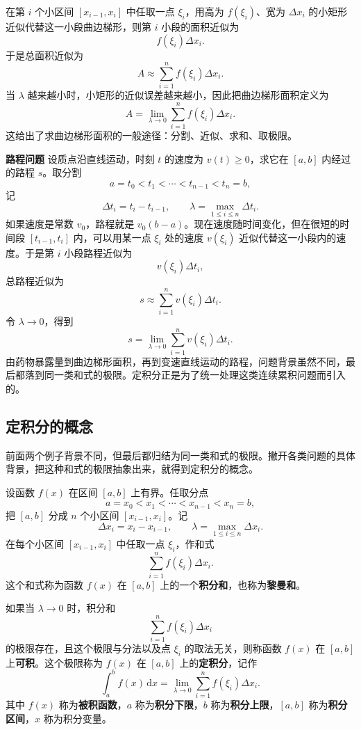 \documentclass[fontset=fandol]{ctexart}
\newenvironment{custom}[1]{\par\noindent\textbf{#1}\quad}{\par\vspace{0.8em}}
\newcommand{\dd}{\mathrm{d}}
\begin{document}
在第 $i$ 个小区间 $[x_{i-1},x_i]$ 中任取一点 $\xi_i$，用高为 $f(\xi_i)$、宽为 $\Delta x_i$ 的小矩形近似代替这一小段曲边梯形，则第 $i$ 小段的面积近似为
\[
f(\xi_i)\Delta x_i.
\]
于是总面积近似为
\[
A\approx \sum_{i=1}^n f(\xi_i)\Delta x_i.
\]
当 $\lambda$ 越来越小时，小矩形的近似误差越来越小，因此把曲边梯形面积定义为
\[
A=\lim_{\lambda\to0}\sum_{i=1}^n f(\xi_i)\Delta x_i.
\]
这给出了求曲边梯形面积的一般途径：分割、近似、求和、取极限。

\begin{custom}{路程问题}
设质点沿直线运动，时刻 $t$ 的速度为 $v(t)\geq0$，求它在 $[a,b]$ 内经过的路程 $s$。取分割
\[
a=t_0<t_1<\cdots<t_{n-1}<t_n=b,
\]
记
\[
\Delta t_i=t_i-t_{i-1},\qquad \lambda=\max_{1\leq i\leq n}\Delta t_i.
\]
如果速度是常数 $v_0$，路程就是 $v_0(b-a)$。现在速度随时间变化，但在很短的时间段 $[t_{i-1},t_i]$ 内，可以用某一点 $\xi_i$ 处的速度 $v(\xi_i)$ 近似代替这一小段内的速度。于是第 $i$ 小段路程近似为
\[
v(\xi_i)\Delta t_i,
\]
总路程近似为
\[
s\approx\sum_{i=1}^n v(\xi_i)\Delta t_i.
\]
令 $\lambda\to0$，得到
\[
s=\lim_{\lambda\to0}\sum_{i=1}^n v(\xi_i)\Delta t_i.
\]
由药物暴露量到曲边梯形面积，再到变速直线运动的路程，问题背景虽然不同，最后都落到同一类和式的极限。定积分正是为了统一处理这类连续累积问题而引入的。
\end{custom}

\subsection{定积分的概念}

前面两个例子背景不同，但最后都归结为同一类和式的极限。撇开各类问题的具体背景，把这种和式的极限抽象出来，就得到定积分的概念。

设函数 $f(x)$ 在区间 $[a,b]$ 上有界。任取分点
\[
a=x_0<x_1<\cdots<x_{n-1}<x_n=b,
\]
把 $[a,b]$ 分成 $n$ 个小区间 $[x_{i-1},x_i]$。记
\[
\Delta x_i=x_i-x_{i-1},\qquad \lambda=\max_{1\leq i\leq n}\Delta x_i.
\]
在每个小区间 $[x_{i-1},x_i]$ 中任取一点 $\xi_i$，作和式
\[
\sum_{i=1}^n f(\xi_i)\Delta x_i.
\]
这个和式称为函数 $f(x)$ 在 $[a,b]$ 上的一个\textbf{积分和}，也称为\textbf{黎曼和}。

\begin{definition}[定积分]
如果当 $\lambda\to0$ 时，积分和
\[
\sum_{i=1}^n f(\xi_i)\Delta x_i
\]
的极限存在，且这个极限与分法以及点 $\xi_i$ 的取法无关，则称函数 $f(x)$ 在 $[a,b]$ 上\textbf{可积}。这个极限称为 $f(x)$ 在 $[a,b]$ 上的\textbf{定积分}，记作
\[
\int_a^b f(x)\,\dd x
=\lim_{\lambda\to0}\sum_{i=1}^n f(\xi_i)\Delta x_i.
\]
其中 $f(x)$ 称为\textbf{被积函数}，$a$ 称为\textbf{积分下限}，$b$ 称为\textbf{积分上限}，$[a,b]$ 称为\textbf{积分区间}，$x$ 称为积分变量。
\end{definition}
\end{document}

